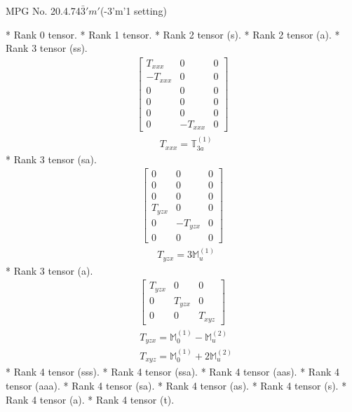 \documentclass[fleqn,8pt,landscape]{jsarticle}
\begin{document}
\setcounter{MaxMatrixCols}{32}

\renewcommand{\tablename}{Table~}
\renewcommand{\figurename}{Figure~}
\begin{center}
\LARGE
MPG No. 20.4.74\quad$\bar{3}'m'$\quad(-3'm'1 setting)
\end{center}
* Rank 0 tensor.
* Rank 1 tensor.
* Rank 2 tensor (s).
* Rank 2 tensor (a).
* Rank 3 tensor (ss).
\begin{align*}
\begin{bmatrix} T_{xxx} & 0 & 0 \\ - T_{xxx} & 0 & 0 \\ 0 & 0 & 0 \\ 0 & 0 & 0 \\ 0 & 0 & 0 \\ 0 & - T_{xxx} & 0 \end{bmatrix}
\end{align*}
\begin{align*}
& T_{xxx} = \mathbb{T}_{3a}^{(1)}
\end{align*}
* Rank 3 tensor (sa).
\begin{align*}
\begin{bmatrix} 0 & 0 & 0 \\ 0 & 0 & 0 \\ 0 & 0 & 0 \\ T_{yzx} & 0 & 0 \\ 0 & - T_{yzx} & 0 \\ 0 & 0 & 0 \end{bmatrix}
\end{align*}
\begin{align*}
& T_{yzx} = 3 \mathbb{M}_{u}^{(1)}
\end{align*}
* Rank 3 tensor (a).
\begin{align*}
\begin{bmatrix} T_{yzx} & 0 & 0 \\ 0 & T_{yzx} & 0 \\ 0 & 0 & T_{xyz} \end{bmatrix}
\end{align*}
\begin{align*}
& T_{yzx} = \mathbb{M}_{0}^{(1)} - \mathbb{M}_{u}^{(2)} \\
& T_{xyz} = \mathbb{M}_{0}^{(1)} + 2 \mathbb{M}_{u}^{(2)}
\end{align*}
* Rank 4 tensor (sss).
* Rank 4 tensor (ssa).
* Rank 4 tensor (aas).
* Rank 4 tensor (aaa).
* Rank 4 tensor (sa).
* Rank 4 tensor (as).
* Rank 4 tensor (s).
* Rank 4 tensor (a).
* Rank 4 tensor (t).
\end{document}
